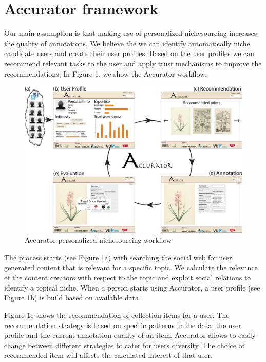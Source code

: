 \section{Accurator framework}
\label{architecture}
Our main assumption is that making use of personalized nichesourcing increases the quality of annotations. We believe the we can identify automatically niche candidate users and create their user profiles. Based on the user profiles we can recommend relevant tasks to the user and apply trust mechanisms to improve the recommendations. In Figure 1, we show the Accurator workflow. 

\begin{figure}[hbt]
	\centering
	\includegraphics[width=\textwidth]{accurator_diagram.jpg}
  	\caption{Accurator personalized nichesourcing workflow}
\end{figure}

The process starts (see Figure 1a) with searching the social web for user generated content that is relevant for a specific topic. We calculate the relevance of the content creators with respect to the topic and exploit social relations to identify a topical niche. When a person starts using Accurator, a user profile (see Figure 1b) is build based on available data.

Figure 1c shows the recommendation of collection items for a user. The recommendation strategy is based on specific patterns in the data, the user profile and the current annotation quality of an item. Accurator allows to easily change between different strategies to cater for users diversity.
The choice of recommended item will affects the calculated interest of that user.


